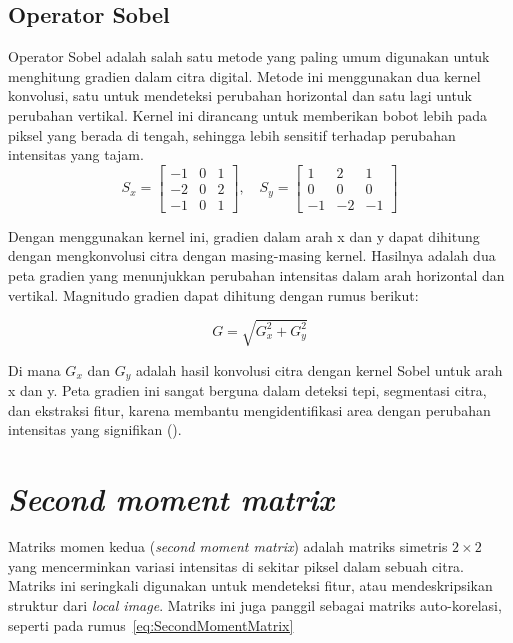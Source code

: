 \subsection{Operator Sobel}
  Operator Sobel adalah salah satu metode yang paling umum digunakan untuk menghitung gradien dalam citra digital. Metode ini menggunakan dua kernel konvolusi, satu untuk mendeteksi perubahan horizontal dan satu lagi untuk perubahan vertikal. Kernel ini dirancang untuk memberikan bobot lebih pada piksel yang berada di tengah, sehingga lebih sensitif terhadap perubahan intensitas yang tajam.
\begin{equation}
  S_x = \begin{bmatrix}
    -1 & 0 & 1 \\
    -2 & 0 & 2 \\
    -1 & 0 & 1
  \end{bmatrix}, \quad
  S_y = \begin{bmatrix}
    1 & 2 & 1 \\
    0 & 0 & 0 \\
    -1 & -2 & -1
  \end{bmatrix}
  \label{eq:sobel-kernel}
\end{equation}

  Dengan menggunakan kernel ini, gradien dalam arah x dan y dapat dihitung dengan mengkonvolusi citra dengan masing-masing kernel. Hasilnya adalah dua peta gradien yang menunjukkan perubahan intensitas dalam arah horizontal dan vertikal. Magnitudo gradien dapat dihitung dengan rumus berikut:

\begin{equation}
  G = \sqrt{G_x^2 + G_y^2}
\end{equation}

  Di mana \(G_x\) dan \(G_y\) adalah hasil konvolusi citra dengan kernel Sobel untuk arah x dan y. Peta gradien ini sangat berguna dalam deteksi tepi, segmentasi citra, dan ekstraksi fitur, karena membantu mengidentifikasi area dengan perubahan intensitas yang signifikan (\cite[hlm. 306--307]{Sanchez2018}).

\section{\emph{Second moment matrix}}
  Matriks momen kedua (\emph{second moment matrix}) adalah matriks simetris \(2 \times 2\) yang mencerminkan variasi intensitas di sekitar piksel dalam sebuah citra. Matriks ini seringkali digunakan untuk mendeteksi fitur, atau mendeskripsikan struktur dari \emph{local image}.
Matriks ini juga panggil sebagai matriks auto-korelasi, seperti pada rumus~\ref{eq:SecondMomentMatrix}

